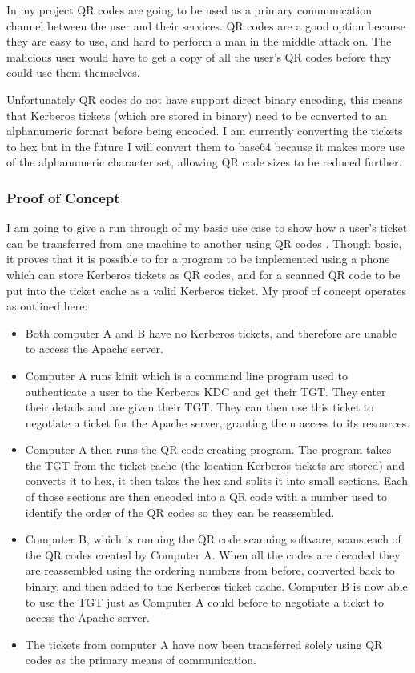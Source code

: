 \documentclass[]{report}   %
\begin{document}
In my project QR codes are going to be used as a primary communication channel between the user and their services. QR codes are a good option because they are easy to use, and hard to perform a man in the middle attack on. The malicious user would have to get a copy of all the user's QR codes before they could use them themselves.

Unfortunately QR codes do not have support direct binary encoding, this means that Kerberos tickets (which are stored in binary) need to be converted to an alphanumeric format before being encoded. I am currently converting the tickets to hex but in the future I will convert them to base64 because it makes more use of the alphanumeric character set, allowing QR code sizes to be reduced further.

\subsubsection{Proof of Concept} 
I am going to give a run through of my basic use case to show how a user’s ticket can be transferred from one machine to another using QR codes \cite{YouTubeDemo}. Though basic, it proves that it is possible to for a program to be implemented using a phone which can store Kerberos tickets as QR codes, and for a scanned QR code to be put into the ticket cache as a valid Kerberos ticket. My proof of concept operates as outlined here:

\begin{itemize}
	\item Both computer A and B have no Kerberos tickets, and therefore are unable to access the Apache server.
	\item Computer A runs kinit which is a command line program used to authenticate a user to the Kerberos KDC and get their TGT. They enter their details and are given their TGT. They can then use this ticket to negotiate a ticket for the Apache server, granting them access to its resources.
	\item Computer A then runs the QR code creating program. The program takes the TGT from the ticket cache (the location Kerberos tickets are stored) and converts it to hex, it then takes the hex and splits it into small sections. Each of those sections are then encoded into a QR code with a number used to identify the order of the QR codes so they can be reassembled. 
	\item Computer B, which is running the QR code scanning software, scans each of the QR codes created by Computer A. When all the codes are decoded they are reassembled using the ordering numbers from before, converted back to binary, and then added to the Kerberos ticket cache. Computer B is now able to use the TGT just as Computer A could before to negotiate a ticket to access the Apache server.
	\item The tickets from computer A have now been transferred solely using QR codes as the primary means of communication.
\end{itemize}
\end{document}
